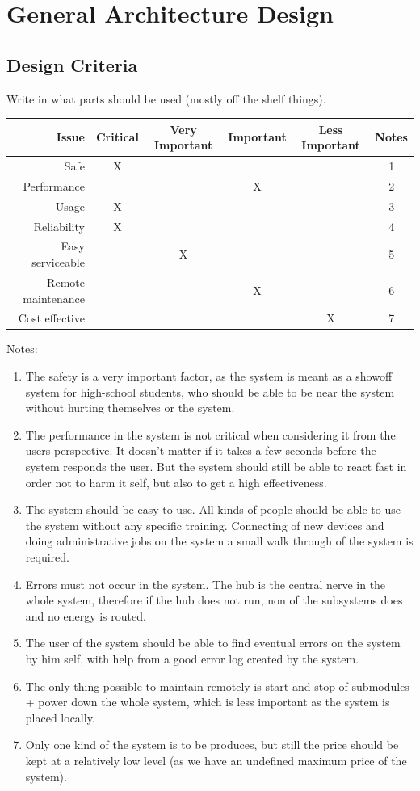 \section{General Architecture Design}
	\subsection{Design Criteria}
		Write in what parts should be used (mostly off the shelf things).
				\begin{table}[H]
					\begin{tabular}{| r | c | c | c | c | c |}
					\hline
					Issue & Critical & Very Important & Important & Less Important & Notes \\ \hline
					Safe					& X & ~ & ~ & ~ & 1 \\ \hline
					Performance 			& ~ & ~ & X & ~ & 2 \\ \hline
					Usage 				& X & ~ & ~ & ~ & 3 \\ \hline
					Reliability 			& X & ~ & ~ & ~ & 4 \\ \hline
					Easy serviceable 		& ~ & X & ~ & ~ & 5 \\ \hline
					Remote maintenance 	& ~ & ~ & X & ~ & 6 \\ \hline
					Cost effective 			& ~ & ~ & ~ & X & 7 \\ \hline
					\end{tabular}
				\end{table}
			Notes:
			\begin{enumerate}
			\item The safety is a very important factor, as the system is meant as a showoff system for high-school students, who should
			be able to be near the system without hurting themselves or the system.
			\item The performance in the system is not critical when considering it from the users perspective. It doesn't matter if it takes a few seconds before the system responds the user.
			But the system should still be able to react fast in order not to harm it self, but also to get a high effectiveness. 
			\item The system should be easy to use. All kinds of people should be able to use the system without any specific training.
			Connecting of new devices and doing administrative jobs on the system a small walk through of the system is required. 
			\item Errors must not occur in the system. The hub is the central nerve in the whole system, therefore if the hub does not run, non of the subsystems does and no energy is routed.
			\item The user of the system should be able to find eventual errors on the system by him self, with help from a good error log created by the system.
			\item The only thing possible to maintain remotely is start and stop of submodules + power down the whole system, which is less important as the system is placed locally.
			\item Only one kind of the system is to be produces, but still the price should be kept at a relatively low level (as we have an undefined maximum price of the system).
			\end{enumerate}

